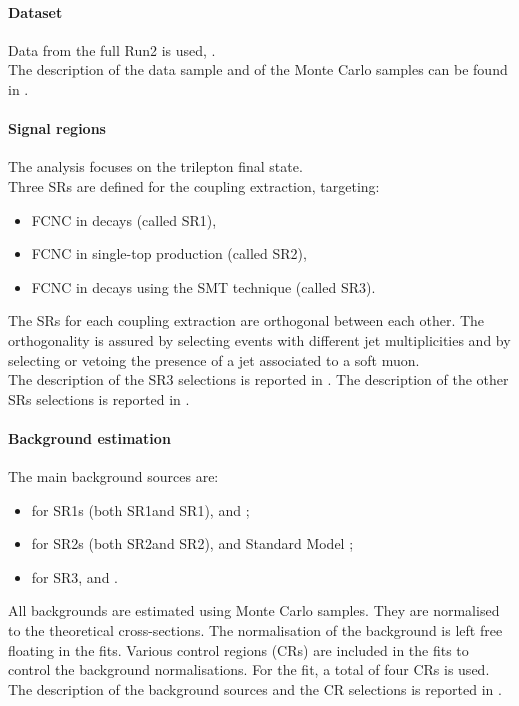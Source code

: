 \paragraph{Dataset}
Data from the full Run2 is used, \lumi. \\
The description of the data sample and of the Monte Carlo samples can
be found in .

\paragraph{Signal regions}
The analysis focuses on the trilepton final state. \\
Three SRs are defined for the \tZc coupling extraction, targeting:
\begin{itemize}
	\item FCNC \tZc in \ttbar decays (called SR1\tZc), 
	\item FCNC \tZc in single-top production (called SR2\tZc), 
	\item FCNC \tZc in \ttbar decays using the SMT technique (called SR3\tZc).
\end{itemize}
The SRs for each coupling extraction are orthogonal between each other. 
The orthogonality is assured by selecting events with different jet multiplicities 
and by selecting or vetoing the presence of a jet associated to a soft muon.\\
The description of the SR3 selections is reported in .
The description of the other SRs selections is reported in .

\paragraph{Background estimation}
The main background sources are:
\begin{itemize}
	\item for SR1s (both SR1\tZu and SR1\tZc), \ttZ and \VVHF;
	\item for SR2s (both SR2\tZu and SR2\tZc), \VVHF and Standard Model \tZq ;
	\item for SR3, \ttZ and \VVHF.
\end{itemize}

\noindent All backgrounds are estimated using Monte Carlo samples. They are
normalised to the theoretical cross-sections. The normalisation of the
\ttbar background is left free floating in the fits.
Various control regions (CRs) are included in the fits to control the
background normalisations. For the fit, a total of four CRs is used. 
The description of the background sources and the CR selections is
reported in .

